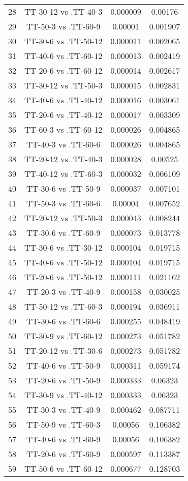 \documentclass[a4paper,10pt]{article}
\begin{document}
\begin{landscape}
\begin{table}[!htp]
\begin{tabular}{cccc}
28&TT-30-12 vs .TT-40-3&0.000009&0.00176\\
29&TT-50-3 vs .TT-60-9&0.00001&0.001907\\
30&TT-30-6 vs .TT-50-12&0.000011&0.002065\\
31&TT-40-6 vs .TT-60-12&0.000013&0.002419\\
32&TT-20-6 vs .TT-60-12&0.000014&0.002617\\
33&TT-30-12 vs .TT-50-3&0.000015&0.002831\\
34&TT-40-6 vs .TT-40-12&0.000016&0.003061\\
35&TT-20-6 vs .TT-40-12&0.000017&0.003309\\
36&TT-60-3 vs .TT-60-12&0.000026&0.004865\\
37&TT-40-3 vs .TT-60-6&0.000026&0.004865\\
38&TT-20-12 vs .TT-40-3&0.000028&0.00525\\
39&TT-40-12 vs .TT-60-3&0.000032&0.006109\\
40&TT-30-6 vs .TT-50-9&0.000037&0.007101\\
41&TT-50-3 vs .TT-60-6&0.00004&0.007652\\
42&TT-20-12 vs .TT-50-3&0.000043&0.008244\\
43&TT-30-6 vs .TT-60-9&0.000073&0.013778\\
44&TT-30-6 vs .TT-30-12&0.000104&0.019715\\
45&TT-40-6 vs .TT-50-12&0.000104&0.019715\\
46&TT-20-6 vs .TT-50-12&0.000111&0.021162\\
47&TT-20-3 vs .TT-40-9&0.000158&0.030025\\
48&TT-50-12 vs .TT-60-3&0.000194&0.036911\\
49&TT-30-6 vs .TT-60-6&0.000255&0.048419\\
50&TT-30-9 vs .TT-60-12&0.000273&0.051782\\
51&TT-20-12 vs .TT-30-6&0.000273&0.051782\\
52&TT-40-6 vs .TT-50-9&0.000311&0.059174\\
53&TT-20-6 vs .TT-50-9&0.000333&0.06323\\
54&TT-30-9 vs .TT-40-12&0.000333&0.06323\\
55&TT-30-3 vs .TT-40-9&0.000462&0.087711\\
56&TT-50-9 vs .TT-60-3&0.00056&0.106382\\
57&TT-40-6 vs .TT-60-9&0.00056&0.106382\\
58&TT-20-6 vs .TT-60-9&0.000597&0.113387\\
59&TT-50-6 vs .TT-60-12&0.000677&0.128703\\

\end{tabular}
\end{table}
\end{landscape}
\end{document}
